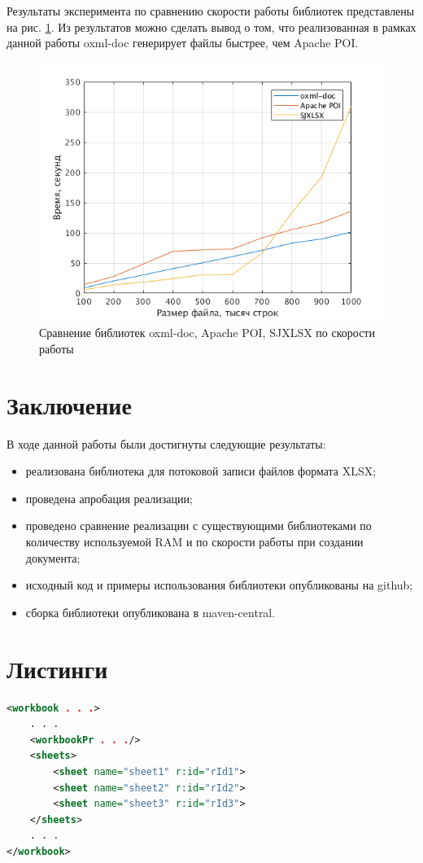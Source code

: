\documentclass[14pt]{matmex-diploma}
\begin{document}
Результаты эксперимента по сравнению скорости работы библиотек представлены на рис. \ref{speed}. Из результатов можно сделать вывод о том, что реализованная в рамках данной работы oxml-doc генерирует файлы быстрее, чем Apache POI. 
\begin{figure}
    \centering
    \includegraphics[width=\textwidth]{pics/speed.png}
    \caption{Сравнение библиотек oxml-doc, Apache POI, SJXLSX по скорости работы \label{speed}}
\end{figure}

\section*{Заключение}
В ходе данной работы были достигнуты следующие результаты:
\begin{itemize}
    \item реализована библиотека для потоковой записи файлов формата XLSX;
    \item проведена апробация реализации;
    \item проведено сравнение реализации с существующими библиотеками по количеству используемой RAM и по скорости работы при создании документа;
    \item исходный код и примеры использования библиотеки опубликованы на github;
    \item сборка библиотеки опубликована в maven-central.
\end{itemize}

\section*{Листинги}
\begin{lstlisting}[language=XML, style=basic, caption={Пример файла workbook.xml},captionpos=b, label=list1]
<workbook . . .>
    . . .
    <workbookPr . . ./>
    <sheets>
        <sheet name="sheet1" r:id="rId1">
        <sheet name="sheet2" r:id="rId2">
        <sheet name="sheet3" r:id="rId3">
    </sheets>
    . . .
</workbook>
\end{lstlisting}
\end{document}
